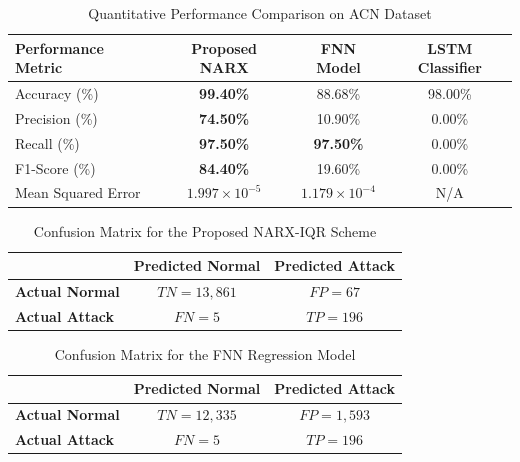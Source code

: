 \documentclass[conference]{IEEEtran}
\begin{document}
\begin{table}[!t]
\caption{Quantitative Performance Comparison on ACN Dataset}
\label{tab:comparison}
\centering
\begin{tabular}{lccc}
\toprule
\textbf{Performance Metric} & \textbf{Proposed NARX} & \textbf{FNN Model} & \textbf{LSTM Classifier \cite{Basnet2020}} \\
\midrule
Accuracy (\%)       & \textbf{99.40\%} & 88.68\% & 98.00\% \\
Precision (\%)      & \textbf{74.50\%} & 10.90\% & 0.00\% \\
Recall (\%)         & \textbf{97.50\%} & \textbf{97.50\%} & 0.00\% \\
F1-Score (\%)       & \textbf{84.40\%} & 19.60\% & 0.00\% \\
Mean Squared Error  & \textbf{$1.997 \times 10^{-5}$} & $1.179 \times 10^{-4}$ & N/A \\
\bottomrule
\end{tabular}
\end{table}

\begin{table}[!t]
\caption{Confusion Matrix for the Proposed NARX-IQR Scheme}
\label{tab:conf_narx}
\centering
\begin{tabular}{lcc}
\toprule
& \textbf{Predicted Normal} & \textbf{Predicted Attack} \\
\midrule
\textbf{Actual Normal} & $TN = 13,861$ & $FP = 67$ \\
\textbf{Actual Attack} & $FN = 5$ & $TP = 196$ \\
\bottomrule
\end{tabular}
\end{table}

\begin{table}[!t]
\caption{Confusion Matrix for the FNN Regression Model}
\label{tab:conf_fnn}
\centering
\begin{tabular}{lcc}
\toprule
& \textbf{Predicted Normal} & \textbf{Predicted Attack} \\
\midrule
\textbf{Actual Normal} & $TN = 12,335$ & $FP = 1,593$ \\
\textbf{Actual Attack} & $FN = 5$ & $TP = 196$ \\
\bottomrule
\end{tabular}
\end{table}
\end{document}
